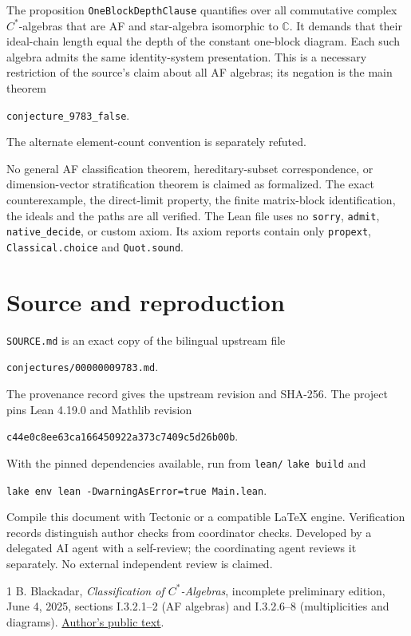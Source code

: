 \documentclass[11pt]{article}
\begin{document}
The proposition \texttt{OneBlockDepthClause} quantifies over all
commutative complex $C^*$-algebras that are AF and star-algebra
isomorphic to $\mathbb C$. It demands that their ideal-chain length
equal the depth of the constant one-block diagram. Each such
algebra admits the same identity-system presentation. This is a
necessary restriction of the source's claim about all AF algebras;
its negation is the main theorem
\begin{center}\small\texttt{conjecture\_9783\_false}.\end{center}
The alternate element-count convention is separately refuted.

No general AF classification theorem, hereditary-subset
correspondence, or dimension-vector stratification theorem is
claimed as formalized. The exact counterexample, the direct-limit
property, the finite matrix-block identification, the ideals and
the paths are all verified. The Lean file uses no \texttt{sorry},
\texttt{admit}, \texttt{native\_decide}, or custom axiom. Its axiom
reports contain only \texttt{propext}, \texttt{Classical.choice}
and \texttt{Quot.sound}.

\section*{Source and reproduction}
\texttt{SOURCE.md} is an exact copy of the bilingual upstream file
\begin{center}\small\texttt{conjectures/00000009783.md}.\end{center}
The provenance record gives the upstream revision and SHA-256.
The project pins Lean 4.19.0 and Mathlib revision
\begin{center}\small\texttt{c44e0c8ee63ca166450922a373c7409c5d26b00b}.\end{center}
With the pinned dependencies available, run from \texttt{lean/}
\texttt{lake build} and
\begin{center}\small\texttt{lake env lean -DwarningAsError=true Main.lean}.\end{center}
Compile this document with Tectonic or a compatible LaTeX engine.
Verification records distinguish author checks from coordinator
checks. Developed by a delegated AI agent with a self-review;
the coordinating agent reviews it separately. No external
independent review is claimed.

\begin{thebibliography}{1}
 B. Blackadar, \emph{Classification of
$C^*$-Algebras}, incomplete preliminary edition, June 4, 2025,
sections I.3.2.1--2 (AF algebras) and I.3.2.6--8 (multiplicities and diagrams).
\href{https://bruceblackadar.com/Mathematics/Class.pdf}{Author's public text}.
\end{thebibliography}
\end{document}
